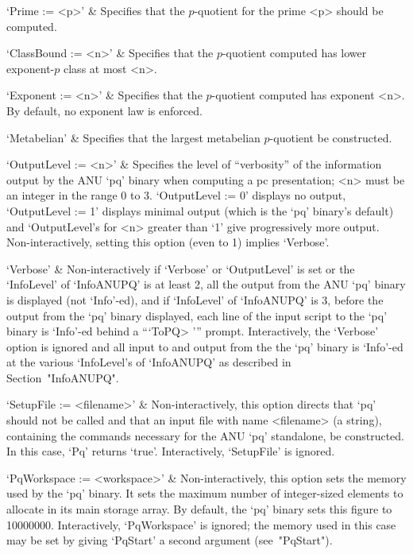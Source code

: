 \beginitems

`Prime := <p>' & 
Specifies that the $p$-quotient for the prime <p> should be computed.

`ClassBound := <n>' & 
Specifies that the $p$-quotient computed has lower exponent-$p$ class  at
most <n>.

`Exponent := <n>' & 
Specifies that the $p$-quotient computed has exponent <n>. By default, no
exponent law is enforced.

`Metabelian' & 
Specifies that the largest metabelian $p$-quotient be constructed.

`OutputLevel := <n>' &
Specifies the level of ``verbosity'' of the information output by the ANU
`pq' binary when computing a pc presentation; <n> must be an  integer  in
the range 0 to 3. `OutputLevel := 0' displays no output, `OutputLevel  :=
1' displays minimal output (which  is  the  `pq'  binary's  default)  and
`OutputLevel's for <n> greater than `1' give progressively  more  output.
Non-interactively, setting this option (even to 1) implies `Verbose'.

`Verbose' &
Non-interactively if `Verbose' or `OutputLevel' is set or the `InfoLevel'
of `InfoANUPQ' is at least 2, all the output from the ANU `pq' binary  is
displayed (not `Info'-ed), and if `InfoLevel' of `InfoANUPQ' is 3, before
the output from the `pq' binary displayed, each line of the input  script
to  the  `pq'  binary  is  `Info'-ed  behind  a   ```ToPQ> '''    prompt.
Interactively, the `Verbose' option is  ignored  and  all  input  to  and
output from the the `pq' binary is `Info'-ed at the various  `InfoLevel's
of `InfoANUPQ' as described in Section~"InfoANUPQ".

`SetupFile := <filename>' &
Non-interactively, this option directs that `pq' should not be called and
that an input file  with  name  <filename>  (a  string),  containing  the
commands necessary for the ANU `pq' standalone, be constructed.  In  this
case, `Pq' returns `true'. Interactively, `SetupFile' is ignored.

`PqWorkspace := <workspace>' &
Non-interactively, this option sets the memory used by the  `pq'  binary.
It sets the maximum number of integer-sized elements to allocate  in  its
main storage array. By default, the  `pq'  binary  sets  this  figure  to
10000000. Interactively, `PqWorkspace' is ignored;  the  memory  used  in
this  case  may  be  set  by   giving   `PqStart'   a   second   argument
(see~"PqStart").

\enditems

